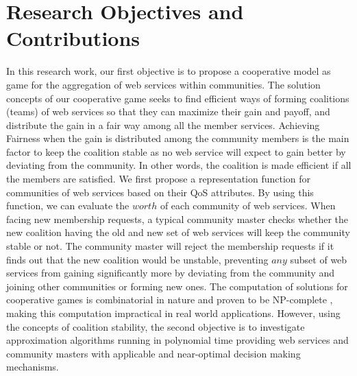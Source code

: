
\section{Research Objectives and Contributions}\label{sec:motexample}

In this research work, our first objective is to propose a
cooperative model as game for the aggregation of web services
within communities. The solution concepts of our cooperative game
seeks to find efficient ways of forming coalitions (teams) of web
services so that they can maximize their gain and payoff, and
distribute the gain in a fair way among all the member services.
Achieving Fairness when the gain is distributed among the
community members is the main factor to keep the coalition stable
as no web service will expect to gain better by deviating from the
community. In other words, the coalition is made efficient if all
the members are satisfied. We first propose a representation
function for communities of web services based on their QoS
attributes. By using this function, we can evaluate the $worth$ of
each community of web services. When facing new membership
requests, a typical community master checks whether the new
coalition having the old and new set of web services will keep the
community stable or not. The community master will reject the
membership requests if it finds out that the new coalition would
be unstable, preventing $any$ subset of web services from gaining
significantly more by deviating from the community and joining
other communities or forming new ones. The computation of
solutions for cooperative games is combinatorial in nature and
proven to be NP-complete \cite{Algorithmic}, making this
computation impractical in real world applications. However, using
the concepts of coalition stability, the second objective is to
investigate approximation algorithms running in polynomial time
providing web services and community masters with applicable and
near-optimal decision making mechanisms.


